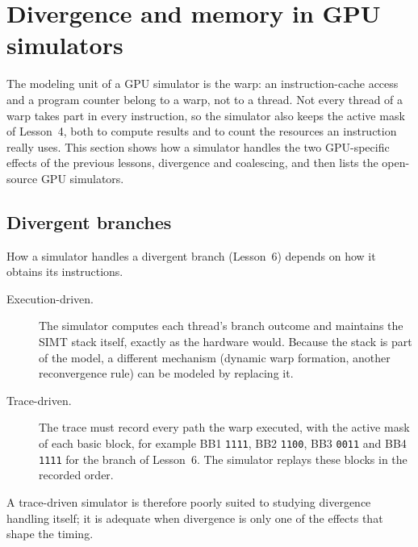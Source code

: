 \documentclass[../main.tex]{subfiles}
\begin{document}
\section{Divergence and memory in GPU simulators}
\label{sec:l08-divergence-memory}

The modeling unit of a GPU simulator is the warp: an instruction-cache
access and a program counter belong to a warp, not to a
thread.  Not every thread of a warp takes
part in every instruction, so the simulator also keeps the active mask
of Lesson~4, both to compute results and to count the resources an
instruction really uses.  This section shows how a simulator handles
the two GPU-specific effects of the previous lessons, divergence and
coalescing, and then lists the open-source GPU simulators.

\subsection{Divergent branches}

How a simulator handles a divergent branch (Lesson~6) depends on how
it obtains its instructions.
\begin{description}
  \item[Execution-driven.]  The simulator computes each thread's branch
    outcome and maintains the SIMT stack itself, exactly as the
    hardware would.  Because the stack is part of the model, a
    different mechanism (dynamic warp formation, another reconvergence
    rule) can be modeled by replacing it.
  \item[Trace-driven.]  The trace must record every path the warp
    executed, with the active mask of each basic block, for example
    BB1 \texttt{1111}, BB2 \texttt{1100}, BB3 \texttt{0011} and BB4
    \texttt{1111} for the branch of Lesson~6.  The simulator replays
    these blocks in the recorded order.
\end{description}
%
A trace-driven simulator is therefore poorly suited to studying
divergence handling itself; it is adequate when divergence is only one
of the effects that shape the timing.
\end{document}
